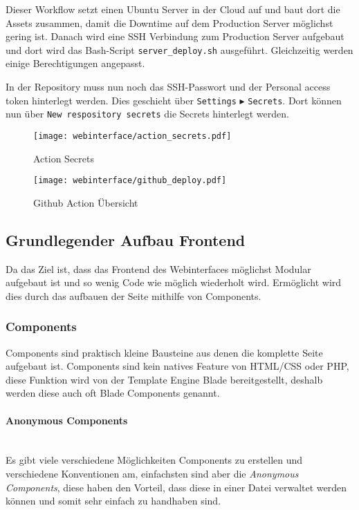 Dieser Workflow setzt einen Ubuntu Server in der Cloud auf und baut dort die
Assets zusammen, damit die Downtime auf dem Production Server möglichst gering
ist. Danach wird eine SSH Verbindung zum Production Server aufgebaut und dort
wird das Bash-Script \verb|server_deploy.sh| ausgeführt. Gleichzeitig werden
einige Berechtigungen angepasst.

In der Repository muss nun noch das SSH-Passwort und der Personal access token
hinterlegt werden. Dies geschieht über \verb|Settings| $\blacktriangleright$
\verb|Secrets|. Dort können nun über \verb|New respository secrets| die Secrets
hinterlegt werden.

\begin{figure}[H]
  \centering
  \texttt{[image: webinterface/action\_secrets.pdf]}
  \caption{Action Secrets}
\end{figure}

\begin{figure}[H]
  \centering
  \texttt{[image: webinterface/github\_deploy.pdf]}
  \caption{Github Action Übersicht}
\end{figure}


\subsection{Grundlegender Aufbau Frontend}

Da das Ziel ist, dass das Frontend des Webinterfaces möglichst Modular aufgebaut ist
und so wenig Code wie möglich wiederholt wird. Ermöglicht wird dies durch das
aufbauen der Seite mithilfe von Components.


\subsubsection{Components}

Components sind praktisch kleine Bausteine aus denen die komplette Seite
aufgebaut ist. Components sind kein natives Feature von HTML/CSS oder PHP, diese
Funktion wird von der Template Engine Blade bereitgestellt, deshalb werden diese
auch oft Blade Components genannt. 

\paragraph{Anonymous Components}\mbox{}\\

Es gibt viele verschiedene Möglichkeiten Components zu erstellen und
verschiedene Konventionen am, einfachsten sind aber die \textit{Anonymous Components}, 
diese haben den Vorteil, dass diese in einer Datei verwaltet werden
können und somit sehr einfach zu handhaben sind.

